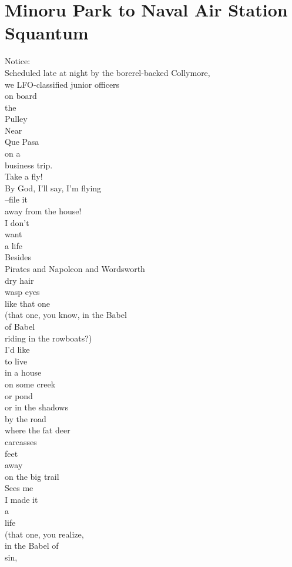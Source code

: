 \documentclass[smalldemyvopaper,11pt,twoside,onecolumn,openright,extrafontsizes]{memoir}
\begin{document}
\chapter{Minoru Park to Naval Air Station Squantum}
Notice:
\\Scheduled late at night by the borerel-backed Collymore,
\\we LFO-classified junior officers
\\on board
\\the
\\Pulley
\\Near
\\Que Pasa
\\on a
\\business trip.
\\Take a fly!
\\By God, I'll say, I'm flying
\\--file it
\\away from the house!
\\I don't
\\want
\\a life
\\Besides
\\Pirates and Napoleon and Wordsworth
\\dry hair
\\wasp eyes
\\like that one
\\(that one, you know, in the Babel
\\of Babel
\\riding in the rowboats?)
\\I'd like
\\to live
\\in a house
\\on some creek
\\or pond
\\or in the shadows
\\by the road
\\where the fat deer
\\carcasses
\\feet
\\away
\\on the big trail
\\Sees me
\\I made it
\\a
\\life
\\(that one, you realize,
\\in the Babel of
\\sin,
\end{document}
